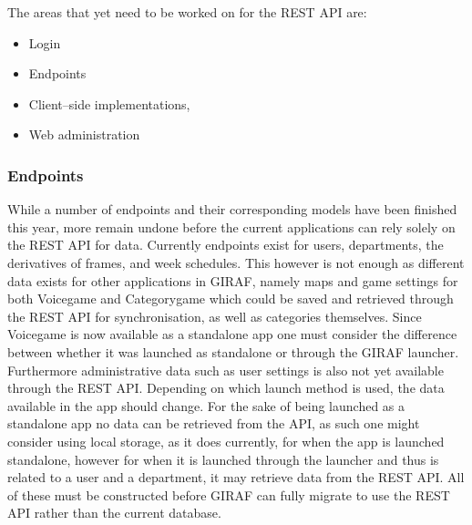 The areas that yet need to be worked on for the REST API are:
\begin{itemize}
\item Login
\item Endpoints
\item Client--side implementations,
\item Web administration
\end{itemize}

\subsubsection*{Endpoints}
While a number of endpoints and their corresponding models have been finished this year, more remain undone before the current applications can rely solely on the REST API for data.
Currently endpoints exist for users, departments, the derivatives of frames, and week schedules.
This however is not enough as different data exists for other applications in GIRAF, namely maps and game settings for both Voicegame and Categorygame which could be saved and retrieved through the REST API for synchronisation, as well as categories themselves.
Since Voicegame is now available as a standalone app one must consider the difference between whether it was launched as standalone or through the GIRAF launcher.
Furthermore administrative data such as user settings is also not yet available through the REST API.
Depending on which launch method is used, the data available in the app should change.
For the sake of being launched as a standalone app no data can be retrieved from the API, as such one might consider using local storage, as it does currently, for when the app is launched standalone, however for when it is launched through the launcher and thus is related to a user and a department, it may retrieve data from the REST API.
All of these must be constructed before GIRAF can fully migrate to use the REST API rather than the current database.

